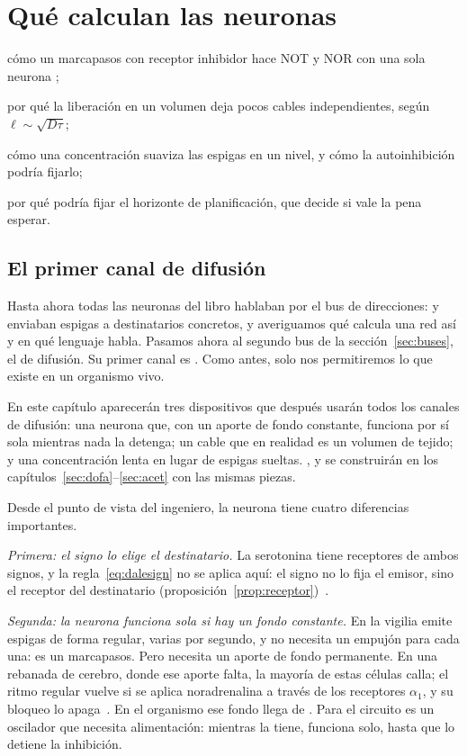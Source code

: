 \chapter{Qué calculan las neuronas }
\label{sec:serocomputer}
\begin{chaptergoals}
\item cómo un marcapasos con receptor inhibidor hace NOT y NOR con una sola neurona ;
\item por qué la liberación en un volumen deja pocos cables independientes, según $\ell\sim\sqrt{D\tau}$;
\item cómo una concentración suaviza las espigas en un nivel, y cómo la autoinhibición podría fijarlo;
\item por qué  podría fijar el horizonte de planificación, que decide si vale la pena esperar.
\end{chaptergoals}

\section{El primer canal de difusión}

Hasta ahora todas las neuronas del libro hablaban por el bus de direcciones:  y  enviaban espigas a destinatarios concretos, y averiguamos qué calcula una red así y en qué lenguaje habla. Pasamos ahora al segundo bus de la sección~\ref{sec:buses}, el de difusión. Su primer canal es . Como antes, solo nos permitiremos lo que existe en un organismo vivo.

En este capítulo aparecerán tres dispositivos que después usarán todos los canales de difusión: una neurona que, con un aporte de fondo constante, funciona por sí sola mientras nada la detenga; un cable que en realidad es un volumen de tejido; y una concentración lenta en lugar de espigas sueltas. ,  y  se construirán en los capítulos~\ref{sec:dofa}--\ref{sec:acet} con las mismas piezas.

Desde el punto de vista del ingeniero, la neurona  tiene cuatro diferencias importantes.

\emph{Primera: el signo lo elige el destinatario.} La serotonina tiene receptores de ambos signos, y la regla~\eqref{eq:dalesign} no se aplica aquí: el signo no lo fija el emisor, sino el receptor del destinatario (proposición~\ref{prop:receptor})~\cite{BarnesSharp1999}.

\emph{Segunda: la neurona  funciona sola si hay un fondo constante.} En la vigilia emite espigas de forma regular, varias por segundo, y no necesita un empujón para cada una: es un marcapasos. Pero necesita un aporte de fondo permanente. En una rebanada de cerebro, donde ese aporte falta, la mayoría de estas células calla; el ritmo regular vuelve si se aplica noradrenalina a través de los receptores $\alpha_1$, y su bloqueo lo apaga~\cite{VandermaelenAghajanian1983}. En el organismo ese fondo llega de . Para el circuito es un oscilador que necesita alimentación: mientras la tiene, funciona solo, hasta que lo detiene la inhibición.


